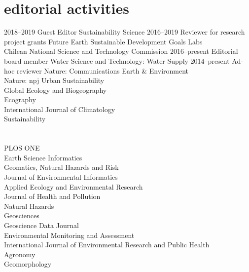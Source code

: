 \documentclass[]{friggeri-cv} %
\begin{document}
\section{editorial activities}

\begin{entrylist}
\entry
{\small{2018--2019}}
{Guest Editor}
{}
{Sustainability Science}
\entry
{\small{2016--2019}}
{Reviewer for research project grants}
{}
{Future Earth Sustainable Development Goals Labs\\
Chilean National Science and Technology Commission}
\entry
{\small{2016--present}}
{Editorial board member}
{}
{Water Science and Technology: Water Supply}
\entry
{\small{2014--present}}
{Ad-hoc reviewer}
{}
{Nature: Communications Earth \& Environment\\
Nature: npj Urban Sustainability\\
Global Ecology and Biogeography\\
Ecography\\
International Journal of Climatology\\
Sustainability}
\end{entrylist}
\section{}
\begin{entrylist}
\entry
{}
{}
{}
{PLOS ONE\\
Earth Science Informatics\\
Geomatics, Natural Hazards and Risk\\
Journal of Environmental Informatics\\
Applied Ecology and Environmental Research\\
Journal of Health and Pollution\\
Natural Hazards\\
Geosciences\\
Geoscience Data Journal\\
Environmental Monitoring and Assessment\\
International Journal of Environmental Research and Public Health\\
Agronomy\\
Geomorphology}

\end{entrylist}
\end{document}
